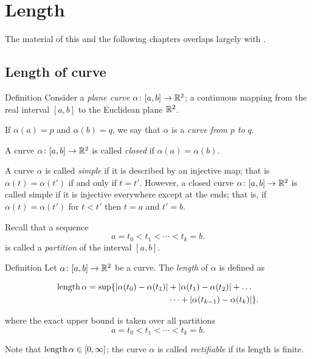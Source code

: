 \chapter{Length}

The material of this and the following chapters overlaps largely with \cite[Chapter 5]{fuchs-tabachnikov}.

\section{Length of curve}


\begin{thm}{Definition}\label{def:curve}
Consider a \emph{plane curve} $\alpha\:[a,b]\z\to \RR^2$; a continuous mapping from the real interval $[a,b]$ to the Euclidean plane $\mathbb{R}^2$. 


If $\alpha(a)=p$ and $\alpha(b)=q$,
we say that $\alpha$ is a \emph{curve from $p$ to $q$}.

A curve $\alpha\colon[a,b]\to \mathbb{R}^2$ is called \emph{closed} if $\alpha(a)=\alpha(b)$.

A curve $\alpha$ is called \emph{simple} if it is described by an injective map;
that is $\alpha(t)=\alpha(t')$ if and only if $t=t'$.
However, a closed curve $\alpha\colon[a,b]\to \mathbb{R}^2$ is called simple if it is injective 
everywhere except at the ends; that is, if
$\alpha(t)=\alpha(t')$ for $t<t'$ then $t=a$ and $t'=b$.
\end{thm}
 
Recall that a sequence 
\[a=t_0 < t_1 < \cdots < t_k=b.\]
is called a \emph{partition} of the interval $[a,b]$.

\begin{thm}{Definition}\label{def:length}
Let $\alpha\colon[a,b]\to \mathbb{R}^2$ be a curve.
The \emph{length} of $\alpha$ is defined as

\begin{align*}
\mathop{\rm length}\nolimits \alpha
= 
\sup \{|\alpha(t_0)-\alpha(t_1)|&+|\alpha(t_1)-\alpha(t_2)|+\dots
\\
&\dots+|\alpha(t_{k-1})-\alpha(t_k)|\}. 
\end{align*}

where the exact upper bound is taken over all partitions
\[a=t_0 < t_1 < \cdots < t_k=b.\]

Note that $\mathop{\rm length}\nolimits\alpha\in[0,\infty]$;
the curve $\alpha$ is called \emph{rectifiable} if its length is finite.
\end{thm}

